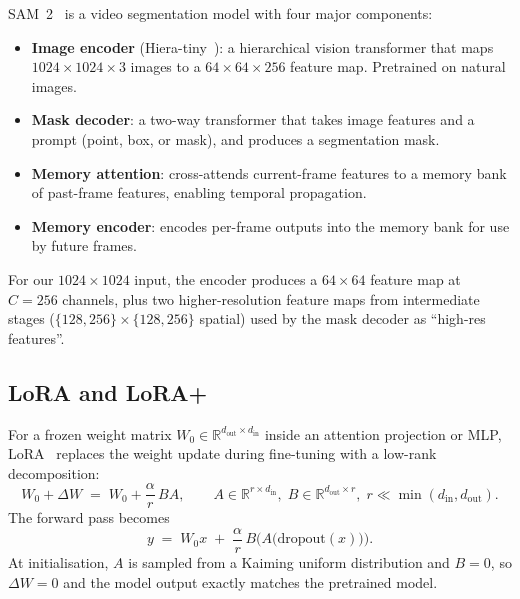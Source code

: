 \documentclass[11pt,a4paper]{article}
\begin{document}
SAM~2~\cite{sam2} is a video segmentation model with four major
components:
\begin{itemize}[noitemsep,topsep=3pt]
    \item \textbf{Image encoder} (Hiera-tiny~\cite{hiera}): a
          hierarchical vision transformer that maps
          $1024{\times}1024{\times}3$ images to a
          $64{\times}64{\times}256$ feature map. Pretrained on
          natural images.
    \item \textbf{Mask decoder}: a two-way transformer that takes
          image features and a prompt (point, box, or mask), and
          produces a segmentation mask.
    \item \textbf{Memory attention}: cross-attends current-frame
          features to a memory bank of past-frame features, enabling
          temporal propagation.
    \item \textbf{Memory encoder}: encodes per-frame outputs into the
          memory bank for use by future frames.
\end{itemize}
For our $1024{\times}1024$ input, the encoder produces a
$64{\times}64$ feature map at $C{=}256$ channels, plus
two higher-resolution feature maps from intermediate stages
($\{128, 256\}{\times}\{128, 256\}$ spatial) used by the mask decoder
as ``high-res features''.

\subsection{LoRA and LoRA+}
\label{sec:lora}

For a frozen weight matrix $W_0\in\mathbb{R}^{d_\text{out}\times d_\text{in}}$
inside an attention projection or MLP, LoRA~\cite{lora} replaces the
weight update during fine-tuning with a low-rank decomposition:
\begin{equation}
    W_0 + \Delta W \;=\; W_0 + \frac{\alpha}{r}\, B A,
    \qquad
    A \in \mathbb{R}^{r \times d_\text{in}},\;
    B \in \mathbb{R}^{d_\text{out} \times r},\;
    r \ll \min(d_\text{in}, d_\text{out}).
\label{eq:lora}
\end{equation}
The forward pass becomes
\begin{equation}
    y \;=\; W_0 x \;+\; \frac{\alpha}{r}\, B\bigl(A\bigl(\mathrm{dropout}(x)\bigr)\bigr).
\end{equation}
At initialisation, $A$ is sampled from a Kaiming uniform distribution and
$B = 0$, so $\Delta W = 0$ and the model output exactly matches the
pretrained model.
\end{document}
